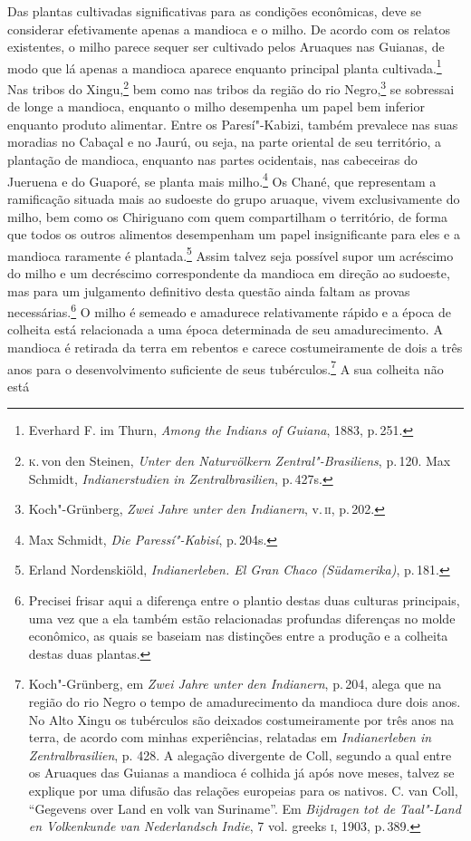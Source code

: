 Das plantas cultivadas significativas para as condições econômicas, deve
se considerar efetivamente apenas a mandioca e o milho. De acordo com
os relatos existentes, o milho parece sequer ser cultivado pelos Aruaques
nas Guianas, de modo que lá apenas a mandioca aparece enquanto principal
planta cultivada.\footnote{Everhard F. im Thurn, \textit{Among the Indians
  of Guiana}, 1883, p.\,251.} Nas tribos do Xingu,\footnote{\textsc{k}.\,von den
  Steinen, \textit{Unter den Naturvölkern Zentral"-Brasiliens}, p.\,120. Max
  Schmidt, \textit{Indianerstudien in Zentralbrasilien}, p.\,427s.} bem
como nas tribos da região do rio Negro,\footnote{Koch"-Grünberg,
  \textit{Zwei Jahre unter den Indianern}, v.\,\textsc{ii}, p.\,202.} se sobressai
de longe a mandioca, enquanto o milho desempenha um papel bem inferior
enquanto produto alimentar. Entre os Paresí"-Kabizi, também prevalece nas
suas moradias no Cabaçal e no Jaurú, ou seja, na parte oriental de seu
território, a plantação de mandioca, enquanto nas partes ocidentais, nas
cabeceiras do Jueruena e do Guaporé, se planta mais milho.\footnote{Max
  Schmidt, \textit{Die Paressí"-Kabisí}, p.\,204s.} Os Chané, que
representam a ramificação situada mais ao sudoeste do grupo aruaque,
vivem exclusivamente do milho, bem como os Chiriguano com quem compartilham 
o território, de forma que todos os outros alimentos
desempenham um papel insignificante para eles e a mandioca raramente é
plantada.\footnote{Erland Nordenskiöld, \textit{Indianerleben. El Gran
  Chaco (Südamerika)}, p.\,181.} Assim talvez seja possível supor um
acréscimo do milho e um decréscimo correspondente da mandioca em direção
ao sudoeste, mas para um julgamento definitivo desta questão ainda
faltam as provas necessárias.\footnote{Precisei frisar aqui a diferença entre o
plantio destas duas culturas principais, uma vez que a ela também estão
relacionadas profundas diferenças no molde econômico, as quais se
baseiam nas distinções entre a produção e a colheita destas duas
plantas.} O milho é semeado e amadurece relativamente rápido e a época de
colheita está relacionada a uma época determinada de seu amadurecimento.
A mandioca é retirada da terra em rebentos e carece costumeiramente de
dois a três anos para o desenvolvimento suficiente de seus
tubérculos.\footnote{Koch"-Grünberg, em \textit{Zwei Jahre unter den
  Indianern}, p.\,204, alega que na região do rio Negro o tempo de
  amadurecimento da mandioca dure dois anos. No Alto Xingu os tubérculos
  são deixados costumeiramente por três anos na terra, de acordo com
  minhas experiências, relatadas em \textit{Indianerleben in Zentralbrasilien}, p.
  428. A alegação divergente de Coll, segundo a qual entre os Aruaques
  das Guianas a mandioca é colhida já após nove meses, talvez se
  explique por uma difusão das relações europeias para os nativos. C.
  van Coll, ``Gegevens over Land en volk van Suriname''. Em
  \textit{Bijdragen tot de Taal"-Land en Volkenkunde van Nederlandsch
  Indie}, 7 vol. greeks \textsc{i}, 1903, p.\,389.} A sua colheita não está
